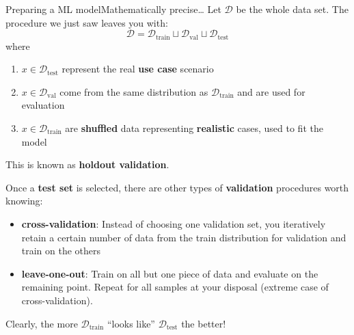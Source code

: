 \begin{frame}{Preparing a ML model}{Mathematically precise\dots}
    Let $\mathcal{D}$ be the whole data set.
    The procedure we just saw leaves you with:
    \begin{equation*}
        \mathcal{D} = \mathcal{D}_{\text{train}} \sqcup \mathcal{D}_{\text{val}} \sqcup \mathcal{D}_{\text{test}}
    \end{equation*}
    where
    \begin{enumerate}
        \item $x \in \mathcal{D}_{\text{test}}$ represent the real \textbf{use case} scenario
        \item $x \in \mathcal{D}_{\text{val}}$ come from the same distribution as $\mathcal{D}_{\text{train}}$ and are used for evaluation
        \item $x \in \mathcal{D}_{\text{train}}$ are \textbf{shuffled} data representing \textbf{realistic} cases, used to fit the model
    \end{enumerate}
    This is known as \textbf{holdout validation}.

    \vfill

    {\footnotesize
        Once a \textbf{test set} is selected, there are other types of \textbf{validation} procedures worth knowing:
        \begin{itemize}
            \item \textbf{cross-validation}: Instead of choosing one validation set, you iteratively retain a certain number of data from the train distribution for validation and train on the others
            \item \textbf{leave-one-out}: Train on all but one piece of data and evaluate on the remaining point. Repeat for all samples at your disposal (extreme case of cross-validation).
        \end{itemize}
    }

    \vfill

    {\tiny Clearly, the more $\mathcal{D}_{\text{train}}$ \enquote{looks like} $\mathcal{D}_{\text{test}}$ the better!}
\end{frame}


